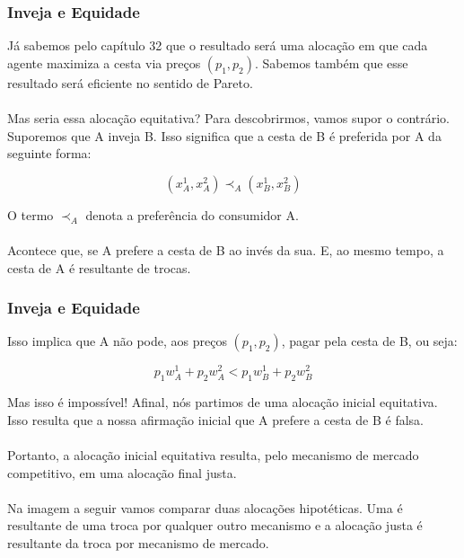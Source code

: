 \documentclass{beamer}[10]
\begin{document}
\begin{frame}
	\frametitle{Inveja e Equidade}

	Já sabemos pelo capítulo 32 que o resultado será uma alocação em que cada agente maximiza a cesta via preços $(p_1,p_2)$. Sabemos também que esse resultado será eficiente no sentido de Pareto.
	\\~\\
	Mas seria essa alocação equitativa? Para descobrirmos, vamos supor o contrário. Suporemos que A inveja B. Isso significa que a cesta de B é preferida por A da seguinte forma:
	
	$$ (x_A^1,x_A^2) \prec_A (x_B^1,x_B^2) $$
	
	O termo $\prec_A$ denota a preferência do consumidor A.
	\\~\\
	Acontece que, se A prefere a cesta de B ao invés da sua. E, ao mesmo tempo, a cesta de A é resultante de trocas.

\end{frame}

\begin{frame}
	\frametitle{Inveja e Equidade}

	Isso implica que A não pode, aos preços $(p_1,p_2)$, pagar pela cesta de B, ou seja:

	$$ p_1w_A^1 + p_2w_A^2 < p_1w_B^1 + p_2w_B^2 $$
	
	Mas isso é impossível! Afinal, nós partimos de uma alocação inicial equitativa. Isso resulta que a nossa afirmação inicial que A prefere a cesta de B é falsa.
	\\~\\
	Portanto, a alocação inicial equitativa resulta, pelo mecanismo de mercado competitivo, em uma alocação final justa.
	\\~\\
	Na imagem a seguir vamos comparar duas alocações hipotéticas. Uma é resultante de uma troca por qualquer outro mecanismo e a alocação justa é resultante da troca por mecanismo de mercado.

\end{frame}
\end{document}
